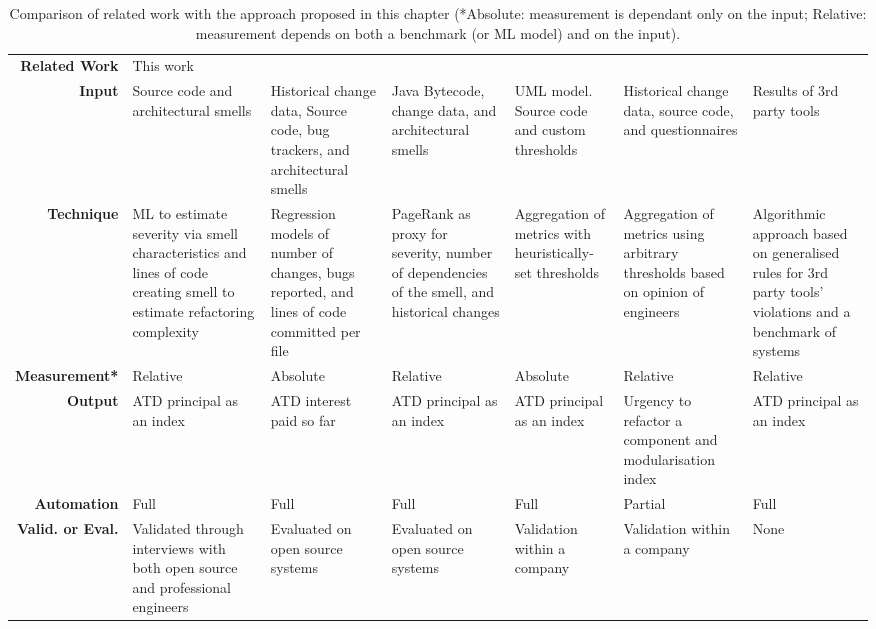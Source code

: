 \begin{sidewaystable}[]
    \scriptsize
    \centering
    \caption{Comparison of related work with the approach proposed in this chapter (*Absolute: measurement is dependant only on the input; Relative: measurement depends on both a benchmark (or ML model) and on the input).}
    \label{c6:tab:rw-comparison}
    \begin{tabular}{r|m{2.5cm}m{2.5cm}m{2cm}m{2cm}m{2cm}m{2cm}}
    \hline
    \textbf{Related Work} & This work & \cite{Xiao2016} & \cite{Roveda2018} & \cite{Martini2018b} & \cite{Wu2018} & \cite{Verdecchia2020} \\
    \textbf{Input} & Source code and architectural smells & Historical change data, Source code, bug trackers, and architectural smells & Java Bytecode, change data, and architectural smells & UML model. Source code and custom thresholds & Historical change data, source code, and questionnaires & Results of 3rd party tools \\
    \textbf{Technique} & ML to estimate severity via smell characteristics and lines of code creating smell to estimate refactoring complexity & Regression models of number of changes, bugs reported, and lines of code committed per file & PageRank as proxy for severity, number of dependencies of the smell, and historical changes & Aggregation of metrics with heuristically-set thresholds & Aggregation of metrics using arbitrary thresholds based on opinion of engineers & Algorithmic approach based on generalised rules for 3rd party tools' violations and a benchmark of systems \\
    \textbf{Measurement*} & Relative & Absolute & Relative & Absolute & Relative & Relative \\
    \textbf{Output} & ATD principal as an index & ATD interest paid so far & ATD principal as an index & ATD principal as an index & Urgency to refactor a component and modularisation index & ATD principal as an index \\
    \textbf{Automation} & Full & Full & Full & Full & Partial & Full \\
    \textbf{Valid. or Eval.} & Validated through interviews with both open source and professional engineers & Evaluated on open source systems & Evaluated on open source systems & Validation within a company & Validation within a company & None \\ \hline
    \end{tabular}
\end{sidewaystable}

